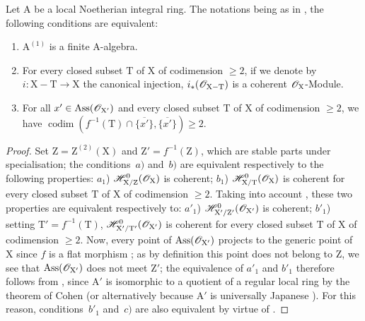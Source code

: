 \begin{proposition}[7.2.3]
\label{IV.7.2.3}
Let $\mathrm{A}$ be a local Noetherian integral ring.
The notations being as in , the following conditions are equivalent:
\begin{enumerate}[label=\emph{\alph*)}]
  \item $\mathrm{A}^{(1)}$ is a finite A-algebra.
  \item For every closed subset $\mathrm{T}$ of $\mathrm{X}$ of codimension $\geqslant 2$, if we denote by $i:\mathrm{X}-\mathrm{T}\to\mathrm{X}$ the canonical injection, $i_*(\mathscr{O}_{\mathrm{X}-\mathrm{T}})$ is a coherent $\mathscr{O}_\mathrm{X}$-Module.
  \item For all $x'\in\operatorname{Ass}(\mathscr{O}_{\mathrm{X}'})$ and every closed subset $\mathrm{T}$ of $\mathrm{X}$ of codimension $\geqslant 2$, we have $\operatorname{codim}(f^{-1}(\mathrm{T})\cap\overline{\{x'\}},\overline{\{x'\}})\geqslant 2$.
\end{enumerate}
\end{proposition}

\begin{proof}
Set $\mathrm{Z}=\mathrm{Z}^{(2)}(\mathrm{X})$  and $\mathrm{Z}'=f^{-1}(\mathrm{Z})$, which are stable parts under specialisation; the conditions~$a)$ and~$b)$ are equivalent respectively to the following properties:
$a_1$) $\mathscr{H}^0_{\mathrm{X}/\mathrm{Z}}(\mathscr{O}_\mathrm{X})$ is coherent;
$b_1$) $\mathscr{H}^0_{\mathrm{X}/\mathrm{T}}(\mathscr{O}_\mathrm{X})$ is coherent for every closed subset $\mathrm{T}$ of $\mathrm{X}$ of codimension $\geqslant 2$.
Taking into account , these two properties are equivalent respectively to:
$a'_1$) $\mathscr{H}^0_{\mathrm{X}'/\mathrm{Z}'}(\mathscr{O}_{\mathrm{X}'})$ is coherent;
$b'_1$) setting $\mathrm{T}'=f^{-1}(\mathrm{T})$, $\mathscr{H}^0_{\mathrm{X}'/\mathrm{T}'}(\mathscr{O}_{\mathrm{X}'})$ is coherent for every closed subset $\mathrm{T}$ of $\mathrm{X}$ of codimension $\geqslant 2$.
Now, every point of $\operatorname{Ass}(\mathscr{O}_{\mathrm{X}'})$ projects to the generic point of $\mathrm{X}$ since $f$ is a flat morphism ; as by definition this point does not belong to $\mathrm{Z}$, we see that $\operatorname{Ass}(\mathscr{O}_{\mathrm{X}'})$ does not meet $\mathrm{Z}'$; the equivalence of $a'_1$ and $b'_1$ therefore follows from , since $\mathrm{A}'$ is isomorphic to a quotient of a regular local ring by the theorem of Cohen  (or alternatively
because $\mathrm{A}'$ is universally Japanese ).
For this reason, conditions~$b'_1$ and~$c)$ are also equivalent by virtue of .
\end{proof}

